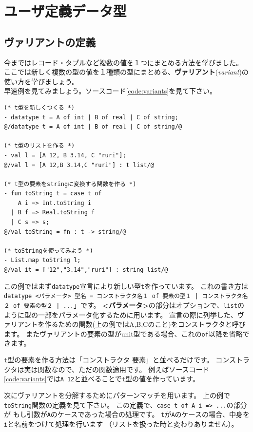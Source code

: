 \documentclass[11pt,a4paper]{article}
\begin{document}
\section{ユーザ定義データ型}
\subsection{ヴァリアントの定義}

今まではレコード・タプルなど複数の値を１つにまとめる方法を学びました。
ここでは新しく複数の型の値を１種類の型にまとめる、\textbf{ヴァリアント}(\textit{variant})の使い方を学びましょう。\\
早速例を見てみましょう。ソースコード\ref{code:variants}を見て下さい。

\begin{lstlisting}[caption=単純なヴァリアント,label=code:variants]
(* t型を新しくつくる *)
- datatype t = A of int | B of real | C of string;
@/datatype t = A of int | B of real | C of string/@

(* t型のリストを作る *)
- val l = [A 12, B 3.14, C "ruri"];
@/val l = [A 12,B 3.14,C "ruri"] : t list/@

(* t型の要素をstringに変換する関数を作る *)
- fun toString t = case t of
    A i => Int.toString i
  | B f => Real.toString f
  | C s => s;
@/val toString = fn : t -> string/@

(* toStringを使ってみよう *)
- List.map toString l;
@/val it = ["12","3.14","ruri"] : string list/@
\end{lstlisting}

この例ではまず\lstinline{datatype}宣言により新しい型\lstinline{t}を作っています。
これの書き方は\lstinline{datatype <パラメータ> 型名 = コンストラクタ名１ of 要素の型１ | コンストラクタ名２ of 要素の型２ | ...}」です。
\textbf{<パラメータ>}の部分はオプションで、\lstinline{list}のように型の一部をパラメータ化するために用います。
宣言の際に列挙した、ヴァリアントを作るための関数(上の例ではA,B,Cのこと)をコンストラクタと呼びます。
またヴァリアントの要素の型がunit型である場合、これの\lstinline{of}以降を省略できます。

\lstinline{t}型の要素を作る方法は「コンストラクタ 要素」と並べるだけです。
コンストラクタは実は関数なので、ただの関数適用です。
例えばソースコード\ref{code:variants}では\lstinline{A 12}と並べることで\lstinline{t}型の値を作っています。

次にヴァリアントを分解するためにパターンマッチを用います。
上の例で\lstinline{toString}関数の定義を見て下さい。
この定義で、\lstinline{case t of A i => ...}の部分が
もし引数が\lstinline{A}のケースであった場合の処理です。
\lstinline{t}が\lstinline{A}のケースの場合、中身を\lstinline{i}と名前をつけて処理を行います
（リストを扱った時と変わりありません）。
\end{document}
